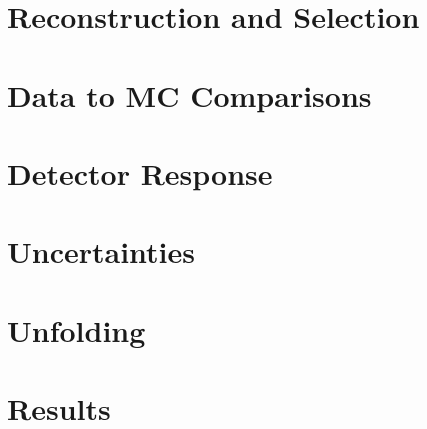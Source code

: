
\section{Reconstruction and Selection}




\section{Data to MC Comparisons}







\section{Detector Response}



























\section{Uncertainties}




\section{Unfolding}



\section{Results}

